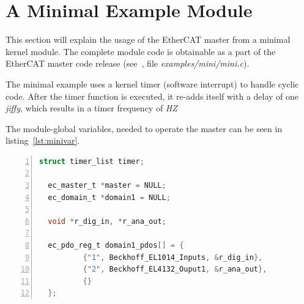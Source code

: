 \documentclass[a4paper,12pt,BCOR6mm,bibtotoc,idxtotoc]{scrbook}
\begin{document}
\section{A Minimal Example Module}
\label{sec:mini}

This section will explain the usage of the EtherCAT master from a
minimal kernel module. The complete module code is obtainable as a
part of the EtherCAT master code release (see~\cite{etherlab}, file
\textit{examples/mini/mini.c}).

The minimal example uses a kernel timer (software interrupt) to handle
cyclic code. After the timer function is executed, it re-adds itself
with a delay of one \textit{jiffy}, which results in a
timer frequency of \textit{HZ}

The module-global variables, needed to operate the master can be seen
in listing~\ref{lst:minivar}.

\begin{lstlisting}[language=C,numbers=left,caption={Minimal
    variables},label=lst:minivar]
  struct timer_list timer;

  ec_master_t *master = NULL;
  ec_domain_t *domain1 = NULL;

  void *r_dig_in, *r_ana_out;

  ec_pdo_reg_t domain1_pdos[] = {
          {"1", Beckhoff_EL1014_Inputs, &r_dig_in},
          {"2", Beckhoff_EL4132_Ouput1, &r_ana_out},
          {}
  };
\end{lstlisting}
\end{document}
